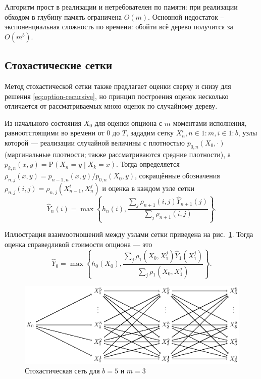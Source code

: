 \documentclass[specialist,
               substylefile = ../spbu.rtx,
               subf,href,colorlinks=true, 12pt]{disser}
\newcommand{\prob}[1]{\mathrm{P}\left(#1\right)}
\begin{document}
Алгоритм прост в реализации и нетребователен по памяти: при реализации обходом в глубину память ограничена $O(m)$. Основной недостаток -- экспоненциальная сложность по времени: обойти всё дерево получится за $O(m^b)$.


\subsection{Стохастические сетки} %
\label{sub:mesh_estimator}

Метод стохастической сетки также предлагает оценки сверху и снизу для решения \eqref{eq:option-recursive}, но принцип построения оценок несколько отличается от рассматриваемых мною оценок по случайному дереву.

Из начального состояния $X_0$ для оценки опциона с $m$ моментами исполнения, равноотстоящими во времени от 0 до $T$, зададим сетку $X_n^i, n\in 1\mathbin{:}m, i \in 1\mathbin{:}b$, узлы которой --- реализации случайной величины с плотностью $p_{0, n}(X_0, \cdot)$ (маргинальные плотности; также рассматриваются средние плотности), а $p_{k, n}(x, y) = \prob{X_n = y \middle\vert X_k = x}$. Тогда определяется $\rho_{n, j}(x, y) = p_{n-1, n}(x, y) / p_{0, n}(X_0, y)$, сокращённые обозначения $\rho_{n, j}(i, j) = \rho_{n, j}(X_{n-1}^i, X_n^j)$ и оценка в каждом узле сетки
$$\hat Y_n(i) = \max\left\lbrace h_n(i), \frac{\sum_j \rho_{n+1}(i, j) \hat Y_{n+1}(j)}{\sum_j \rho_{n+1}(i, j)} \right\rbrace.$$

Иллюстрация взаимоотношений между узлами сетки приведена на рис.~\ref{fig:stochastic_mesh}. Тогда оценка справедливой стоимости опциона --- это $$\hat Y_0 = \max\left\lbrace h_0(X_0), \frac{\sum_j \rho_{1}(X_0, X_1^j) \hat Y_{1}(X_1^j)}{\sum_j \rho_{1}(X_0, X_1^j)} \right\rbrace.$$

\begin{figure}[h]
    \centering
	\includegraphics{stohastic_mesh_vector.eps}
	\caption{Стохастическая сеть для $b = 5$ и $m = 3$}
	\label{fig:stochastic_mesh}
\end{figure}
\end{document}
